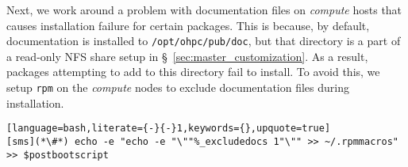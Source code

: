 Next, we work around a problem with documentation files on {\em compute} hosts
that causes installation failure for certain packages.  This is because, by
default, documentation is installed to \texttt{/opt/ohpc/pub/doc}, but that
directory is a part of a read-only NFS share setup in
\S~\ref{sec:master_customization}. As a result, packages attempting to add to
this directory fail to install.  To avoid this, we setup \texttt{rpm} on the
{\em compute} nodes to exclude documentation files during installation.


\begin{lstlisting}[language=bash,literate={-}{-}1,keywords={},upquote=true]
[sms](*\#*) echo -e "echo -e "\""%_excludedocs 1"\"" >> ~/.rpmmacros" >> $postbootscript
\end{lstlisting}
